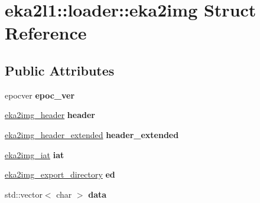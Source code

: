 \hypertarget{structeka2l1_1_1loader_1_1eka2img}{}\section{eka2l1\+:\+:loader\+:\+:eka2img Struct Reference}
\label{structeka2l1_1_1loader_1_1eka2img}
\subsection*{Public Attributes}
\begin{DoxyCompactItemize}
\item 
\mbox{\label{structeka2l1_1_1loader_1_1eka2img_ad2e8bd940283c86de2739c9fa8b8f242}} 
epocver {\bfseries epoc\+\_\+ver}
\item 
\mbox{\label{structeka2l1_1_1loader_1_1eka2img_ab69d3de5ca9540c959d675be7bec246d}} 
\mbox{\hyperlink{structeka2l1_1_1loader_1_1eka2img__header}{eka2img\+\_\+header}} {\bfseries header}
\item 
\mbox{\label{structeka2l1_1_1loader_1_1eka2img_a112fcf1d03e000e5baa87e90afe8e96f}} 
\mbox{\hyperlink{structeka2l1_1_1loader_1_1eka2img__header__extended}{eka2img\+\_\+header\+\_\+extended}} {\bfseries header\+\_\+extended}
\item 
\mbox{\label{structeka2l1_1_1loader_1_1eka2img_a07b94e1a872cdf1beaa42b65749a81ba}} 
\mbox{\hyperlink{structeka2l1_1_1loader_1_1eka2img__iat}{eka2img\+\_\+iat}} {\bfseries iat}
\item 
\mbox{\label{structeka2l1_1_1loader_1_1eka2img_ac4eae540b60b2d9c8cb5dd9f1df71f0f}} 
\mbox{\hyperlink{structeka2l1_1_1loader_1_1eka2img__export__directory}{eka2img\+\_\+export\+\_\+directory}} {\bfseries ed}
\item 
\mbox{\label{structeka2l1_1_1loader_1_1eka2img_a639977802acdfb27d5879bbbf7de354e}} 
std\+::vector$<$ char $>$ {\bfseries data}
\item 
\mbox{\label{structeka2l1_1_1loader_1_1eka2img_a2e9144c73992810219fa4a8b6293daeb}} 

\end{DoxyCompactItemize}

